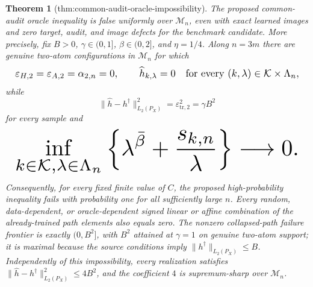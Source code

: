\documentclass{article}
\newtheorem{theorem}{Theorem}
\begin{document}
\begin{theorem}[thm:common-audit-oracle-impossibility]\label{thm:common-audit-oracle-impossibility}
The proposed common-audit oracle inequality is false uniformly over \(\mathcal M_n\), even with exact learned images and zero target, audit, and image defects for the benchmark candidate. More precisely, fix \(B>0\), \(\gamma\in(0,1]\), \(\beta\in(0,2]\), and \(\eta=1/4\). Along \(n=3m\) there are genuine two-atom configurations in \(\mathcal M_n\) for which
\[
\makebox[\linewidth][c]{\resizebox{0.98\linewidth}{!}{\(\displaystyle \varepsilon_{H,2}=\varepsilon_{A,2}=\alpha_{2,n}=0,
 \qquad
 \widehat h_{k,\lambda}=0
 \quad\text{for every }(k,\lambda)\in\mathcal K\times\Lambda_n,\)}}
\]
while
\[
 \|\widehat h-h^\dagger\|_{L_2(P_X)}^2
 =\varepsilon_{\mathrm{tr},2}^2
 =\gamma B^2
\]
for every sample and
\[
\makebox[\linewidth][c]{\resizebox{0.98\linewidth}{!}{\(\displaystyle \inf_{k\in\mathcal K,\lambda\in\Lambda_n}
 \left\{\lambda^{\bar\beta}+\frac{s_{k,n}}{\lambda}\right\}
 \longrightarrow0.\)}}
\]
Consequently, for every fixed finite value of \(C\), the proposed high-probability inequality fails with probability one for all sufficiently large \(n\). Every random, data-dependent, or oracle-dependent signed linear or affine combination of the already-trained path elements also equals zero. The nonzero collapsed-path failure frontier is exactly \((0,B^2]\), with \(B^2\) attained at \(\gamma=1\) on genuine two-atom support; it is maximal because the source conditions imply \(\|h^\dagger\|_{L_2(P_X)}\le B\). Independently of this impossibility, every realization satisfies \(\|\widehat h-h^\dagger\|_{L_2(P_X)}^2\le4B^2\), and the coefficient \(4\) is supremum-sharp over \(\mathcal M_n\).
\end{theorem}
\end{document}
